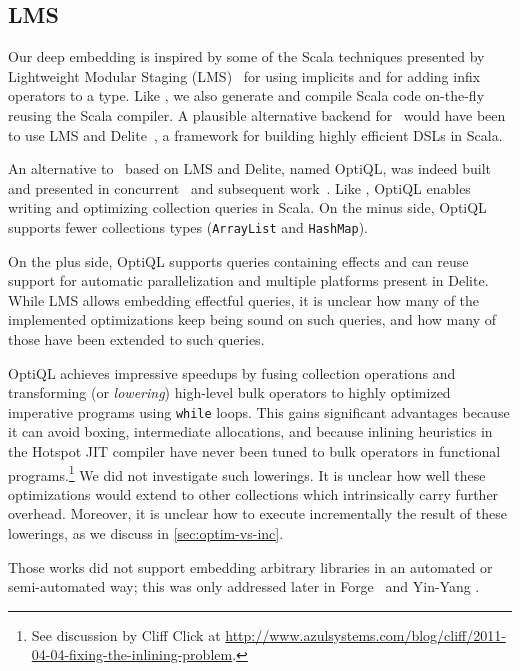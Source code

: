 \subsection{LMS}
\label{sec:rwdsl-lms}
Our deep embedding is inspired by some of the Scala techniques presented by
Lightweight Modular Staging (LMS)~\citep{rompf2010lightweight} for using
implicits and for adding infix operators to a type. Like
\citet{rompf2010lightweight}, we also generate and compile Scala code on-the-fly
reusing the Scala compiler. A plausible alternative backend for \LoS\ would have
been to use LMS and Delite~\citep{Rompf11BBlocks}, a framework for building
highly efficient DSLs in Scala.

An alternative to \LoS\ based on LMS and Delite, named OptiQL, was indeed built
and presented in concurrent~\citep{Rompf13} and subsequent work~\citep{Arvind13}.
Like \LoS, OptiQL enables writing and optimizing collection queries in Scala.
On the minus side, OptiQL supports fewer collections types (\texttt{ArrayList}
and \texttt{HashMap}).

On the plus side, OptiQL supports queries containing effects and can reuse support
for automatic parallelization and multiple platforms present in Delite.
While LMS allows embedding effectful queries, it is unclear how many of the
implemented optimizations keep being sound on such queries, and how many of
those have been extended to such queries.

OptiQL achieves impressive speedups by fusing collection operations and
transforming (or \emph{lowering}) high-level bulk operators to highly optimized
imperative programs using \texttt{while} loops. This gains significant
advantages because it can avoid boxing, intermediate allocations, and because
inlining heuristics in the Hotspot JIT compiler have never been tuned to bulk
operators in functional programs.\footnote{See discussion by Cliff Click at \url{http://www.azulsystems.com/blog/cliff/2011-04-04-fixing-the-inlining-problem}.}
We did not investigate such lowerings. It is unclear how
well these optimizations would extend to other collections which intrinsically
carry further overhead. Moreover, it is unclear how to execute incrementally the
result of these lowerings, as we discuss in \cref{sec:optim-vs-inc}.

Those works did not support embedding arbitrary libraries in an automated or
semi-automated way; this was only addressed later in
Forge~\citep{Sujeeth13Forge} and Yin-Yang \citep{Jovanovic2014}.

